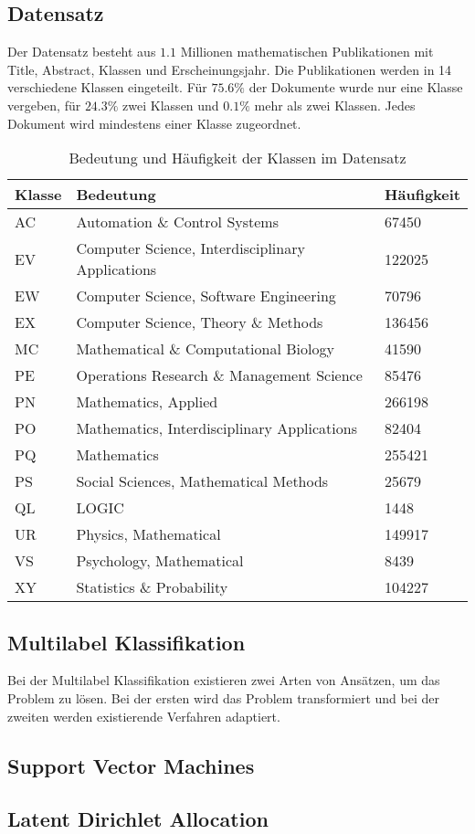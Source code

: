 \subsection{Datensatz}
Der Datensatz besteht aus $1.1$ Millionen mathematischen Publikationen mit Title, Abstract, Klassen und Erscheinungsjahr. Die Publikationen werden in 14 verschiedene Klassen eingeteilt. Für $75.6 \%$ der Dokumente wurde nur eine Klasse vergeben, für $24.3 \%$ zwei Klassen und $0.1 \%$ mehr als zwei Klassen. Jedes Dokument wird mindestens einer Klasse zugeordnet.
\label{sub:datensatz}
\begin{table}[h]
    \centering
    \begin{tabular}{l|l|l}
        \textbf{Klasse} & \textbf{Bedeutung} & \textbf{Häufigkeit}\\
        \hline
        AC & Automation \& Control Systems & 67450\\
        EV & Computer Science, Interdisciplinary Applications & 122025\\
        EW & Computer Science, Software Engineering & 70796\\
        EX & Computer Science, Theory \& Methods & 136456\\
        MC & Mathematical \& Computational Biology & 41590\\
        PE & Operations Research \& Management Science & 85476\\
        PN & Mathematics, Applied & 266198\\
        PO & Mathematics, Interdisciplinary Applications & 82404\\
        PQ & Mathematics & 255421\\
        PS & Social Sciences, Mathematical Methods & 25679\\
        QL & LOGIC & 1448\\
        UR & Physics, Mathematical & 149917\\
        VS & Psychology, Mathematical & 8439\\
        XY & Statistics \& Probability & 104227\\
    \end{tabular}
    \caption{Bedeutung und Häufigkeit der Klassen im Datensatz}
\end{table}


\subsection{Multilabel Klassifikation}
\label{sub:multilabel_klassifikation}
Bei der Multilabel Klassifikation existieren zwei Arten von Ansätzen, um das Problem zu lösen. Bei der ersten wird das Problem transformiert und bei der zweiten werden existierende Verfahren adaptiert.

\subsection{Support Vector Machines}
\label{sub:support_vector_machines}


\subsection{Latent Dirichlet Allocation}
\label{sub:latent_dirichlet_allocation}
